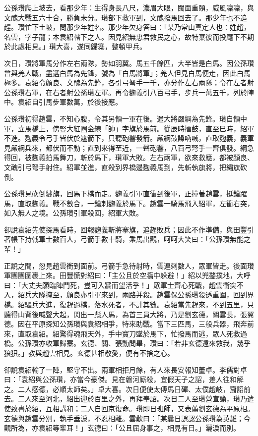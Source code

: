 公孫瓚爬上坡去，看那少年：生得身長八尺，濃眉大眼，闊面重頤，威風凜凜，與文醜大戰五六十合，勝負未分。瓚部下救軍到，文醜撥馬回去了。那少年也不追趕。瓚忙下土坡，問那少年姓名。那少年欠身答曰：「某乃常山真定人也：姓趙，名雲，字子龍；本袁紹轄下之人。因見紹無忠君救民之心，故特棄彼而投麾下不期於此處相見。」瓚大喜，遂同歸寨，整頓甲兵。

次日，瓚將軍馬分作左右兩隊，勢如羽翼。馬五千餘匹，大半皆是白馬。因公孫瓚曾與羌人戰，盡選白馬為先鋒，號為「白馬將軍」；羌人但見白馬便走，因此白馬極多。袁紹令顏良、文醜為先鋒，各引弓弩手一千，亦分作左右兩隊；令在左者射公孫瓚右軍，在右者射公孫瓚左軍。再令麴義引八百弓手，步兵一萬五千，列於陣中。袁紹自引馬步軍數萬，於後接應。

公孫瓚初得趙雲，不知心腹，令其另領一軍在後。遣大將嚴綱為先鋒。瓚自領中軍，立馬橋上，傍豎大紅圈金線「帥」字旗於馬前。從辰時擂鼓，直至巳時，紹軍不進。麴義令弓手皆伏於遮箭下，只聽砲響發箭。嚴綱鼓譟吶喊，直取麴義，義軍見嚴綱兵來，都伏而不動；直到來得至近，一聲砲響，八百弓弩手一齊俱發。綱急得回，被麴義拍馬舞刀，斬於馬下，瓚軍大敗。左右兩軍，欲來救應，都被顏良、文醜引弓弩手射住。紹軍並進，直殺到界橋邊麴義馬到，先斬執旗將，把繡旗砍倒。

公孫瓚見砍倒繡旗，回馬下橋而走。麴義引軍直衝到後軍，正撞著趙雲，挺鎗躍馬，直取麴義。戰不數合，一鎗刺麴義於馬下。趙雲一騎馬飛入紹軍，左衝右突，如入無人之境。公孫瓚引軍殺回，紹軍大敗。

卻說袁紹先使探馬看時，回報麴義斬將搴旗，追趕敗兵；因此不作準備，與田豐引著帳下持戟軍士數百人，弓箭手數十騎，乘馬出觀，呵呵大笑曰：「公孫瓚無能之輩！」

正說之間，忽見趙雲衝到面前。弓箭手急待射時，雲連刺數人，眾軍皆走。後面瓚軍團團圍裹上來。田豐慌對紹曰：「主公且於空牆中躲避！」紹以兜鍪撲地，大呼曰：「大丈夫願臨陣鬥死，豈可入牆而望活乎！」眾軍士齊心死戰，趙雲衝突不入，紹兵大隊掩至，顏良亦引軍來到，兩路并殺。趙雲保公孫瓚殺透重圍，回到界橋。紹驅兵大進，復趕過橋，落水死者，不計其數。袁紹當先趕來，不到五里，只聽得山背後喊聲大起，閃出一彪人馬，為首三員大將，乃是劉玄德，關雲長，張翼德。因在平原探知公孫瓚與袁紹相爭，特來助戰。當下三匹馬，三般兵器，飛奔前來，直取袁紹。紹驚得魂飛天外，手中寶刀墜於馬下，忙撥馬而逃，眾人死救過橋。公孫瓚亦收軍歸寨。玄德、關、張動問畢，瓚曰：「若非玄德遠來救我，幾乎狼狽。」教與趙雲相見。玄德甚相敬愛，便有不捨之心。

卻說袁紹輸了一陣，堅守不出。兩軍相拒月餘，有人來長安報知董卓。李儒對卓曰：「袁紹與公孫瓚，亦當今豪傑。見在磐河廝殺，宜假天子之詔，差人往和解之。二人感德，必順太師矣。」卓大喜。次日便使太傅馬日磾、太僕趙岐，齎詔前去。二人來至河北，紹出迎於百里之外，再拜奉詔。次日二人至瓚營宣諭，瓚乃遣使致書於紹，互相講和；二人自回京復命。瓚即日班師，又表薦劉玄德為平原相。玄德與趙雲分別，執手垂淚，不忍相離。雲歎曰：「某曩日誤認公孫瓚為英雄；今觀所為，亦袁紹等輩耳！」玄德曰：「公且屈身事之，相見有日。」灑淚而別。

